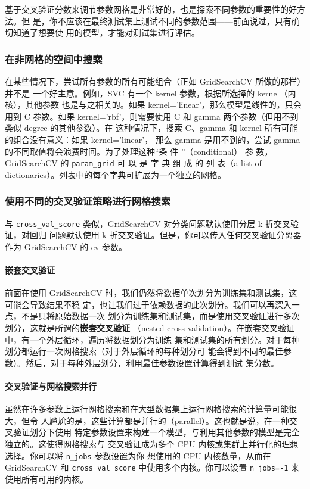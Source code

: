 基于交叉验证分数来调节参数网格是非常好的，也是探索不同参数的重要性的好方法。但
是，你不应该在最终测试集上测试不同的参数范围——前面说过，只有确切知道了想要使
用的模型，才能对测试集进行评估。
\subsubsection{在非网格的空间中搜索}
在某些情况下，尝试所有参数的所有可能组合（正如 GridSearchCV 所做的那样）并不是
一个好主意。例如，SVC 有一个 kernel 参数，根据所选择的 kernel（内核），其他参数
也是与之相关的。如果 kernel='linear'，那么模型是线性的，只会用到 C 参数。如果
kernel='rbf'，则需要使用 C 和 gamma 两个参数（但用不到类似 degree 的其他参数）。在
这种情况下，搜索 C、gamma 和 kernel 所有可能的组合没有意义：如果 kernel='linear'，
那么 gamma 是用不到的，尝试 gamma 的不同取值将会浪费时间。为了处理这种“条
件 ”（conditional） 参 数，GridSearchCV 的 \verb|param_grid| 可 以 是 字 典 组 成 的 列 表（a list of
dictionaries）。列表中的每个字典可扩展为一个独立的网格。
\subsubsection{使用不同的交叉验证策略进行网格搜索}
与 \verb|cross_val_score| 类似，GridSearchCV 对分类问题默认使用分层 k 折交叉验证，对回归
问题默认使用 k 折交叉验证。但是，你可以传入任何交叉验证分离器作为 GridSearchCV 的
cv 参数。

\paragraph{嵌套交叉验证} 前面在使用 GridSearchCV 时，我们仍然将数据单次划分为训练集和测试集，这可能会导致结果不稳
定，也让我们过于依赖数据的此次划分。我们可以再深入一点，不是只将原始数据一次
划分为训练集和测试集，而是使用交叉验证进行多次划分，这就是所谓的\textbf{嵌套交叉验证}
（nested cross-validation）。在嵌套交叉验证中，有一个外层循环，遍历将数据划分为训练
集和测试集的所有划分。对于每种划分都运行一次网格搜索（对于外层循环的每种划分可
能会得到不同的最佳参数）。然后，对于每种外层划分，利用最佳参数设置计算得到测试
集分数。

\paragraph{交叉验证与网格搜索并行} 虽然在许多参数上运行网格搜索和在大型数据集上运行网格搜索的计算量可能很大，但令
人尴尬的是，这些计算都是并行的（parallel）。这也就是说，在一种交叉验证划分下使用
特定参数设置来构建一个模型，与利用其他参数的模型是完全独立的。这使得网格搜索与
交叉验证成为多个 CPU 内核或集群上并行化的理想选择。你可以将 \verb|n_jobs| 参数设置为你
想使用的 CPU 内核数量，从而在 GridSearchCV 和 \verb|cross_val_score| 中使用多个内核。你可以设置 \verb|n_jobs=-1| 来使用所有可用的内核。

